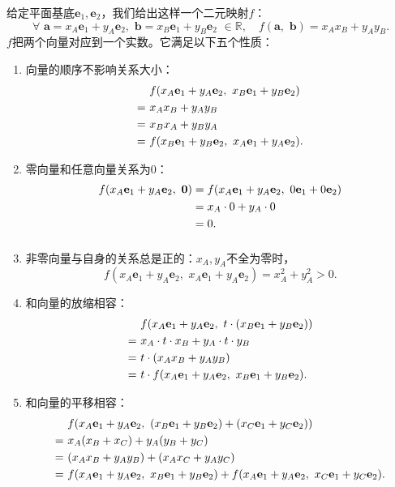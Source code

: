 \documentclass[12pt,UTF8]{ctexbook}
\begin{document}
给定平面基底$\mathbf{e}_1, \mathbf{e}_2$，我们给出这样一个二元映射$f$：
$$ \forall \,\, \mathbf{a} = x_A\mathbf{e}_1 + y_A\mathbf{e}_2, \,\, \mathbf{b} = x_B\mathbf{e}_1 + y_B\mathbf{e}_2 \,\, \in \mathbb{R}, \quad f(\mathbf{a}, \,\, \mathbf{b}) = x_Ax_B + y_Ay_B.$$
$f$把两个向量对应到一个实数。它满足以下五个性质：
\begin{enumerate}
    \item 向量的顺序不影响关系大小：
    \begin{align}
          & f(x_A\mathbf{e}_1 + y_A\mathbf{e}_2,\,\, x_B\mathbf{e}_1 + y_B\mathbf{e}_2) \notag \\
        =\,\,& x_Ax_B + y_A y_B \notag \\
        =\,\,& x_Bx_A + y_By_A \notag \\
        =\,\,& f(x_B\mathbf{e}_1 + y_B\mathbf{e}_2,\,\, x_A\mathbf{e}_1 + y_A\mathbf{e}_2). \notag
    \end{align}
    \item 零向量和任意向量关系为$0$：
    \begin{align}
        f(x_A\mathbf{e}_1 + y_A\mathbf{e}_2,\,\, \mathbf{0}) &= f(x_A\mathbf{e}_1 + y_A\mathbf{e}_2,\,\, 0\mathbf{e}_1 + 0\mathbf{e}_2) \notag \\
        &= x_A\cdot 0 + y_A\cdot 0 \notag \\
        &= 0. \notag
    \end{align}
    $$$$
    \item 非零向量与自身的关系总是正的：$x_A, y_A$不全为零时，
    $$f(x_A\mathbf{e}_1 + y_A\mathbf{e}_2,\,\, x_A\mathbf{e}_1 + y_A\mathbf{e}_2) = x_A^2 + y_A^2  > 0.$$
    \item 和向量的放缩相容：
    \begin{align}
        & f(x_A\mathbf{e}_1 + y_A\mathbf{e}_2,\,\, t\cdot (x_B\mathbf{e}_1 + y_B\mathbf{e}_2)) \notag \\
        =\,\,& x_A\cdot t\cdot x_B + y_A\cdot t\cdot y_B \notag \\
        =\,\,& t\cdot (x_Ax_B + y_Ay_B) \notag \\
        =\,\,& t\cdot f(x_A\mathbf{e}_1 + y_A\mathbf{e}_2,\,\, x_B\mathbf{e}_1 + y_B\mathbf{e}_2). \notag 
    \end{align}
    \item 和向量的平移相容：
    \begin{align}
         & f(x_A\mathbf{e}_1 + y_A\mathbf{e}_2, \,\, (x_B\mathbf{e}_1 + y_B\mathbf{e}_2) + (x_C\mathbf{e}_1 + y_C\mathbf{e}_2)) \notag \\
         =\,\,& x_A(x_B + x_C) + y_A (y_B + y_C) \notag \\
         =\,\,& (x_Ax_B + y_Ay_B) + (x_Ax_C + y_Ay_C) \notag \\
         =\,\,& f(x_A\mathbf{e}_1 + y_A\mathbf{e}_2, \,\,x_B\mathbf{e}_1 + y_B\mathbf{e}_2) + f(x_A\mathbf{e}_1 + y_A\mathbf{e}_2, \,\,x_C\mathbf{e}_1 + y_C\mathbf{e}_2). \notag
    \end{align}     
\end{enumerate}
\end{document}
